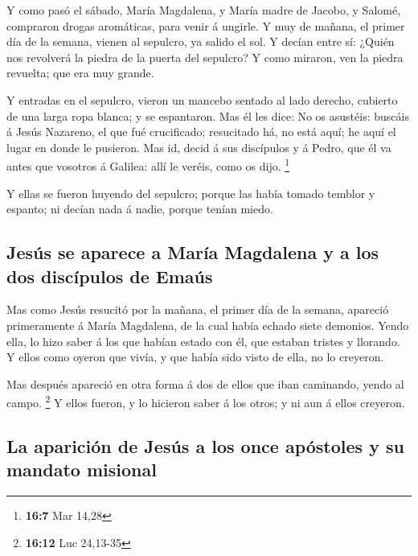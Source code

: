  Y como pasó el sábado, María Magdalena, y María madre de
Jacobo, y Salomé, compraron drogas aromáticas, para venir á ungirle.
 Y muy de mañana, el primer día de la semana, vienen al
sepulcro, ya salido el sol.  Y decían entre sí: ¿Quién nos
revolverá la piedra de la puerta del sepulcro?  Y como
miraron, ven la piedra revuelta; que era muy grande.

 Y entradas en el sepulcro, vieron un mancebo sentado al
lado derecho, cubierto de una larga ropa blanca; y se espantaron.
 Mas él les dice: No os asustéis: buscáis á Jesús
Nazareno, el que fué crucificado; resucitado há, no está aquí; he aquí
el lugar en donde le pusieron.  Mas id, decid á sus
discípulos y á Pedro, que él va antes que vosotros á Galilea: allí le
veréis, como os dijo. \footnote{\textbf{16:7} Mar 14,28}

 Y ellas se fueron huyendo del sepulcro; porque las había
tomado temblor y espanto; ni decían nada á nadie, porque tenían miedo.

\hypertarget{jesuxfas-se-aparece-a-maruxeda-magdalena-y-a-los-dos-discuxedpulos-de-emauxfas}{%
\subsection{Jesús se aparece a María Magdalena y a los dos discípulos de
Emaús}\label{jesuxfas-se-aparece-a-maruxeda-magdalena-y-a-los-dos-discuxedpulos-de-emauxfas}}

 Mas como Jesús resucitó por la mañana, el primer día de
la semana, apareció primeramente á María Magdalena, de la cual había
echado siete demonios.  Yendo ella, lo hizo saber á los
que habían estado con él, que estaban tristes y llorando.
 Y ellos como oyeron que vivía, y que había sido visto de
ella, no lo creyeron.

 Mas después apareció en otra forma á dos de ellos que
iban caminando, yendo al campo. \footnote{\textbf{16:12} Luc 24,13-35}
 Y ellos fueron, y lo hicieron saber á los otros; y ni
aun á ellos creyeron.

\hypertarget{la-apariciuxf3n-de-jesuxfas-a-los-once-apuxf3stoles-y-su-mandato-misional}{%
\subsection{La aparición de Jesús a los once apóstoles y su mandato
misional}\label{la-apariciuxf3n-de-jesuxfas-a-los-once-apuxf3stoles-y-su-mandato-misional}}

